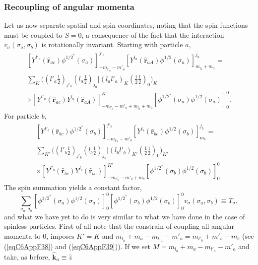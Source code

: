 \begin{subappendices}
\subsubsection{Recoupling of angular momenta}
Let us now separate spatial and spin coordinates, noting that the spin functions must be coupled to $S=0$, a consequence of the fact that the  interaction $v_\sigma(\sigma_a,\sigma_b)$ is rotationally invariant. Starting with particle $a$,
\begin{multline}\label{eqC6AppF38}
\left[ Y^{l'_a} (\hat {\mathbf{r}}_{ac})\phi^{1/2^*}(\sigma_a)\right]^{j'_a}_{-m_{l'_a}-m'_a}\left[ Y^{l_a} (\hat {\mathbf{r}}_{aA})\phi^{1/2}(\sigma_a)\right]^{j_a}_{m_{l_a}+m_a}=\\
\sum_K \bigl((l'_a \tfrac{1}{2})_{j'_a}(l_a \tfrac{1}{2})_{j_a}|(l_a l'_a)_K(\tfrac{1}{2} \tfrac{1}{2})_0\bigr)_K\\
\times \left[ Y^{l'_a} (\hat {\mathbf{r}}_{ac})Y^{l_a} (\hat {\mathbf{r}}_{aA})\right]^{K}_{-m_{l'_a}-m'_a+m_{l_a}+m_a}\left[\phi^{1/2^*}(\sigma_a)\phi^{1/2}(\sigma_a)\right]^0_0.
\end{multline}
For particle $b$,
\begin{multline}\label{eqC6AppF39}
\left[ Y^{l'_b} (\hat {\mathbf{r}}_{bc})\phi^{1/2^*}(\sigma_b)\right]^{j'_b}_{-m_{l'_b}-m'_b}\left[ Y^{l_b} (\hat {\mathbf{r}}_{bc})\phi^{1/2}(\sigma_b)\right]^{j_b}_{m_b}=\\
\sum_{K'} \bigl((l'_b \tfrac{1}{2})_{j'_b}(l_b \tfrac{1}{2})_{j_b}|(l_b l'_b)_{K'}(\tfrac{1}{2} \tfrac{1}{2})_0\bigr)_{K'}\\
\times \left[ Y^{l'_b} (\hat {\mathbf{r}}_{bc})Y^{l_b} (\hat {\mathbf{r}}_{bc})\right]^{K'}_{-m_{l'_b}-m'_b+m_b}\left[\phi^{1/2^*}(\sigma_b)\phi^{1/2}(\sigma_b)\right]^0_0.
\end{multline}
The spin summation yields a constant factor,
 \begin{equation}\label{eqC6AppG41}
\sum_{\sigma_a,\sigma_b}\left[\phi^{1/2^*}(\sigma_a)\phi^{1/2}(\sigma_a)\right]^0_0\left[\phi^{1/2^*}(\sigma_b)\phi^{1/2}(\sigma_b)\right]^0_0v_\sigma(\sigma_a,\sigma_b)\equiv T_\sigma,
\end{equation}
and what we have yet to do is very similar to what we have done in the case of spinless particles. First of all note that the constrain of coupling all angular momenta to 0, imposes $K'=K$ and $m_{l_a}+m_a-m_{l'_a}-m'_a=m_{l'_b}+m'_b-m_b$ (see (\ref{eqC6AppF38}) and (\ref{eqC6AppF39})). If we set $M=m_{l_a}+m_a-m_{l'_a}-m'_a$ and take, as before, $\hat {\mathbf{k}}_a\equiv \hat z$
\begin{multline}\label{eqC6AppG42}

\end{multline}
\end{subappendices}
